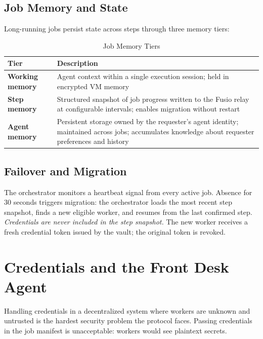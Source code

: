 \documentclass[10pt,twocolumn]{article}
\begin{document}
\subsection{Job Memory and State}

Long-running jobs persist state across steps through three memory tiers:

\begin{table}[H]
\centering
\caption{Job Memory Tiers}
\label{tab:memory}
\renewcommand{\arraystretch}{1.3}
\begin{tabularx}{\columnwidth}{>{\bfseries\small}p{1.6cm} X}
\toprule
Tier & Description \\
\midrule
Working memory & Agent context within a single execution session; held in encrypted VM memory \\
Step memory & Structured snapshot of job progress written to the Fusio relay at configurable intervals; enables migration without restart \\
Agent memory & Persistent storage owned by the requester's agent identity; maintained across jobs; accumulates knowledge about requester preferences and history \\
\bottomrule
\end{tabularx}
\end{table}

\subsection{Failover and Migration}

The orchestrator monitors a heartbeat signal from every active job. Absence for 30 seconds triggers migration: the orchestrator loads the most recent step snapshot, finds a new eligible worker, and resumes from the last confirmed step. \emph{Credentials are never included in the step snapshot.} The new worker receives a fresh credential token issued by the vault; the original token is revoked.

\section{Credentials and the Front Desk Agent}
\label{sec:credentials}

Handling credentials in a decentralized system where workers are unknown and untrusted is the hardest security problem the protocol faces. Passing credentials in the job manifest is unacceptable: workers would see plaintext secrets.
\end{document}
